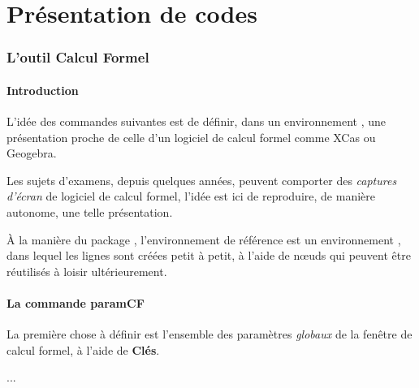 \documentclass{article}
\newcommand\ctex[1]{\tcbox[vignettelatex]{#1}}
\newcommand\Cle[1]{{\bfseries\sffamily\textlangle #1\textrangle}}
\begin{document}
\newpage

\part{Présentation de codes}

\section{L'outil \og Calcul Formel \fg}

\subsection{Introduction}

\begin{codeidee}
L'idée des commandes suivantes est de définir, dans un environnement \TikZ, une présentation proche de celle d'un logiciel de calcul formel comme \textsf{XCas} ou \textsf{Geogebra}.

\smallskip

Les sujets d'examens, depuis quelques années, peuvent comporter des \textit{captures d'écran} de logiciel de calcul formel, l'idée est ici de reproduire, de manière autonome, une telle présentation.

\smallskip

À la manière du {package} \ctex{tkz-tab}, l'environnement de référence est un environnement \TikZ, dans lequel les lignes sont créées petit à petit, à l'aide de nœuds qui peuvent être réutilisés à loisir ultérieurement.
\end{codeidee}

\subsection{La commande \og paramCF \fg}

\begin{codeinfo}
La première chose à définir est l'ensemble des paramètres \textit{globaux} de la fenêtre de calcul formel, à l'aide de \Cle{Clés}.
\end{codeinfo}

\begin{codetex}
...
\end{codetex}
\end{document}
